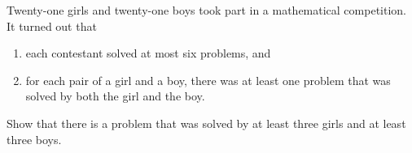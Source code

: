 Twenty-one girls and twenty-one boys took part in a mathematical competition. It turned out that
\begin{enumerate}
\item[(i)] each contestant solved at most six problems, and
\item[(ii)] for each pair of a girl and a boy, there was at least one problem that was solved by both the girl and the boy.
\end{enumerate}
Show that there is a problem that was solved by at least three girls and at least three boys.
